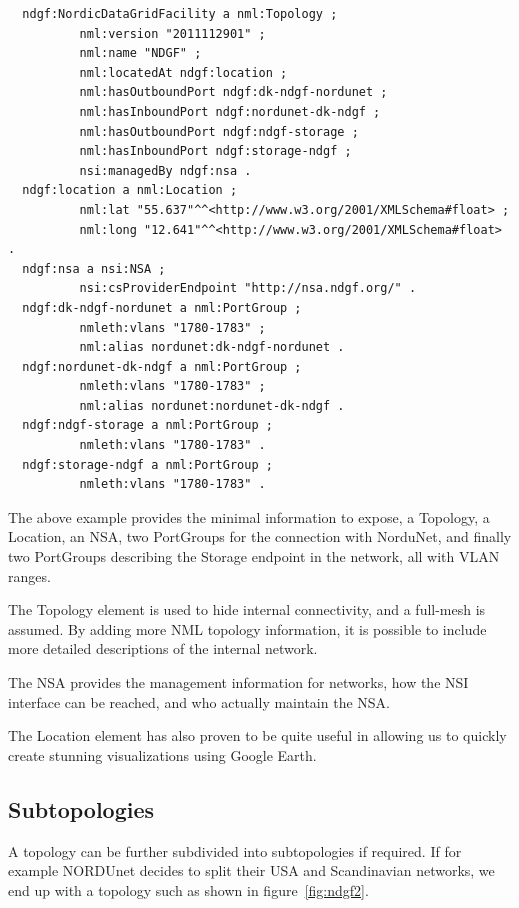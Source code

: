 \documentclass[12pt]{article}  %
\begin{document}
\begin{verbatim}
  ndgf:NordicDataGridFacility a nml:Topology ;
          nml:version "2011112901" ;
          nml:name "NDGF" ;
          nml:locatedAt ndgf:location ;
          nml:hasOutboundPort ndgf:dk-ndgf-nordunet ;
          nml:hasInboundPort ndgf:nordunet-dk-ndgf ;
          nml:hasOutboundPort ndgf:ndgf-storage ;
          nml:hasInboundPort ndgf:storage-ndgf ;
          nsi:managedBy ndgf:nsa .
  ndgf:location a nml:Location ;
          nml:lat "55.637"^^<http://www.w3.org/2001/XMLSchema#float> ;
          nml:long "12.641"^^<http://www.w3.org/2001/XMLSchema#float> .
  ndgf:nsa a nsi:NSA ;
          nsi:csProviderEndpoint "http://nsa.ndgf.org/" .
  ndgf:dk-ndgf-nordunet a nml:PortGroup ;
          nmleth:vlans "1780-1783" ;
          nml:alias nordunet:dk-ndgf-nordunet .
  ndgf:nordunet-dk-ndgf a nml:PortGroup ;
          nmleth:vlans "1780-1783" ;
          nml:alias nordunet:nordunet-dk-ndgf .
  ndgf:ndgf-storage a nml:PortGroup ;
          nmleth:vlans "1780-1783" .
  ndgf:storage-ndgf a nml:PortGroup ;
          nmleth:vlans "1780-1783" .
\end{verbatim}



 The above example provides the minimal information to expose, 
a Topology, a Location, an NSA, two PortGroups for the connection with NorduNet, 
and finally two PortGroups describing the Storage endpoint in the network, all 
with VLAN ranges.

 The Topology element is used to hide internal connectivity, and 
a full-mesh is assumed. By adding more NML topology information, it is possible 
to include more detailed descriptions of the internal network.


 The NSA provides the management information for networks, how 
the NSI interface can be reached, and who actually maintain the NSA.

 The Location element has also proven to be quite useful in allowing 
us to quickly create stunning visualizations using Google Earth.\label{h.xynx25fm6som}


\subsection{Subtopologies}

 A topology can be further subdivided into subtopologies if required. 
If for example NORDUnet decides to split their USA and Scandinavian networks, we 
end up with a topology such as shown in figure~\ref{fig:ndgf2}.
\end{document}
